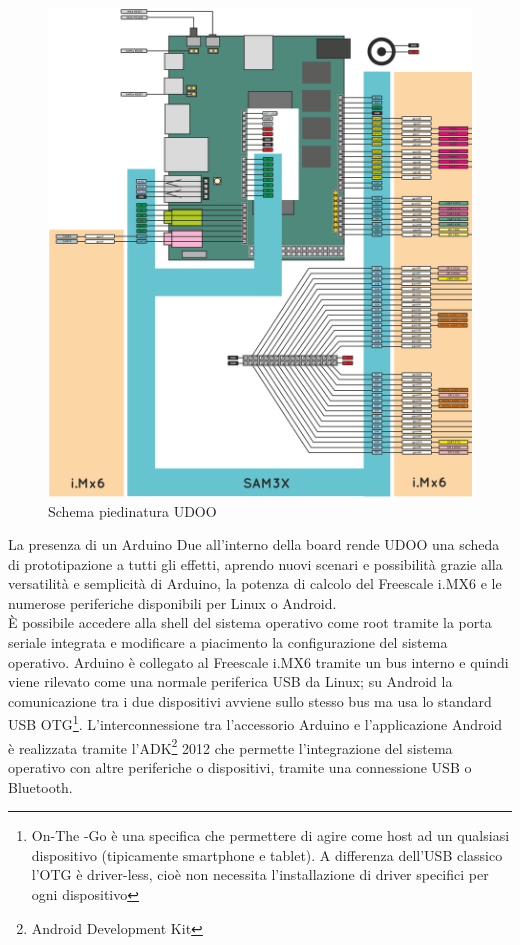 \begin{figure}[!htb] \center
\includegraphics[width=\textwidth]{immagini/udoo_pinout.png}
\caption{Schema piedinatura UDOO} 
\end{figure}

La presenza di un Arduino Due all'interno della board rende UDOO una scheda di 
prototipazione a tutti gli effetti, aprendo nuovi scenari e 
possibilità grazie alla versatilità e semplicità di Arduino, la potenza di 
calcolo del Freescale i.MX6 e le numerose periferiche disponibili per Linux o 
Android.\\
È possibile accedere alla shell del 
sistema operativo come root tramite la porta seriale integrata e modificare a 
piacimento la configurazione del sistema operativo. Arduino è collegato al 
Freescale i.MX6 tramite un bus interno e quindi viene rilevato come una 
normale periferica USB da Linux; su Android la comunicazione tra i due 
dispositivi avviene sullo stesso bus ma usa lo standard USB OTG\footnote{On-The
-Go è una specifica che permettere di agire come host ad un qualsiasi  
dispositivo (tipicamente smartphone e tablet). A differenza dell'USB classico 
l'OTG è driver-less, cioè non necessita l'installazione di driver specifici 
per ogni dispositivo}. L'interconnessione tra l'accessorio Arduino e 
l'applicazione Android è realizzata tramite l'ADK\footnote{Android Development 
Kit} 2012 che permette l'integrazione del sistema operativo con altre periferiche 
o dispositivi, tramite una connessione USB o Bluetooth.
